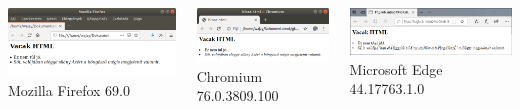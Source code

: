 \documentclass[usenames,dvipsnames,aspectratio=169]{beamer}
\begin{document}
\begin{frame}
  \scriptsize
  \begin{exampleblock}{}
    
  \end{exampleblock}
  \begin{columns}[T]
      \begin{center}
        \includegraphics[width=\textwidth]{hibas_firefox.png} \\
        Mozilla Firefox 69.0
      \end{center}
      \begin{center}
        \includegraphics[width=\textwidth]{hibas_chromium.png} \\
        Chromium 76.0.3809.100
      \end{center}
      \begin{center}
        \includegraphics[width=\textwidth]{hibas_edge.png} \\
        Microsoft Edge 44.17763.1.0
      \end{center}
  \end{columns}
\end{frame}
\end{document}
